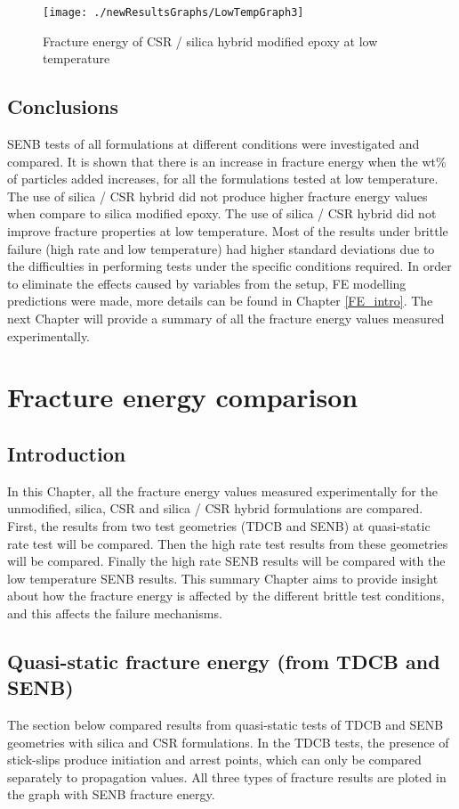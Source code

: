 \documentclass[numbers=noendperiod,chapterprefix=on]{icldt} %
\begin{document}
\begin{figure}[!h]
\centering
\texttt{[image: ./newResultsGraphs/LowTempGraph3]}
\caption{Fracture energy of CSR / silica hybrid modified epoxy at low temperature}\label{LowTempGraph3}
\end{figure}
\FloatBarrier

\section{Conclusions}
SENB tests of all formulations at different conditions were investigated and compared. It is shown that there is an increase in fracture energy when the wt\% of particles added increases, for all the formulations tested at low temperature. The use of silica / CSR hybrid did not produce higher fracture energy values when compare to silica modified epoxy. The use of silica / CSR hybrid did not improve fracture properties at low temperature.
Most of the results under brittle failure (high rate and low temperature) had higher standard deviations due to the difficulties in performing tests under the specific conditions required. In order to eliminate the effects caused by variables from the setup, FE modelling predictions were made, more details can be found in Chapter \ref{FE_intro}. The next Chapter will provide a summary of all the fracture energy values measured experimentally.

\chapter{Fracture energy comparison} \label{TDCB_SENB}

\section{Introduction}
In this Chapter, all the fracture energy values measured experimentally for the unmodified, silica, CSR and silica / CSR hybrid formulations are compared. First, the results from two test geometries (TDCB and SENB) at quasi-static rate test will be compared. Then the high rate test results from these geometries will be compared. Finally the high rate SENB results will be compared with the low temperature SENB results. This summary Chapter aims to provide insight about how the fracture energy is affected by the different brittle test conditions, and this affects the failure mechanisms.

\section{Quasi-static fracture energy (from TDCB and SENB)}
The section below compared results from quasi-static tests of TDCB and SENB geometries with silica and CSR formulations. 
In the TDCB tests, the presence of stick-slips produce initiation and arrest points, which can only be compared separately to propagation values. All three types of fracture results are ploted in the graph with SENB fracture energy.
\end{document}
